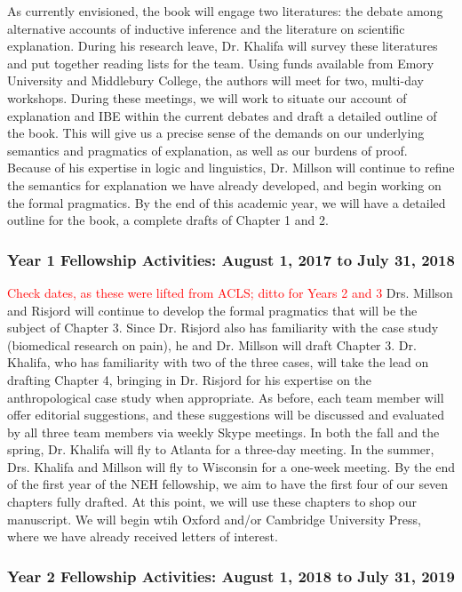 \documentclass{article}[11pt]
\begin{document}
As currently envisioned, the book will engage two literatures:  the debate among alternative accounts of inductive inference and the literature on scientific explanation. During his research leave, Dr. Khalifa will survey these literatures and put together reading lists for the team.  Using funds available from Emory University and Middlebury College, the authors will meet for two, multi-day workshops.  During these meetings, we will work to situate our account of explanation and IBE within the current debates and draft a detailed outline of the book.  This will give us a precise sense of the demands on our underlying semantics and pragmatics of explanation, as well as our burdens of proof. Because of his expertise in logic and linguistics, Dr. Millson will continue to refine the semantics for explanation we have already developed, and begin working on the formal pragmatics. By the end of this academic year, we will have a detailed outline for the book, a complete drafts of Chapter 1 and 2.  

\subsubsection*{Year 1 Fellowship Activities: August 1, 2017 to July 31, 2018}
\textcolor{red}{Check dates, as these were lifted from ACLS; ditto for Years 2 and 3}
Drs. Millson and Risjord will continue to develop the formal pragmatics that will be the subject of Chapter 3. Since Dr. Risjord also has familiarity with the case study (biomedical research on pain), he and Dr. Millson will draft Chapter 3. Dr. Khalifa, who has familiarity with two of the three cases, will take the lead on drafting Chapter 4, bringing in Dr. Risjord for his expertise on the anthropological case study when appropriate. As before, each team member will offer editorial suggestions, and these suggestions will be discussed and evaluated by all three team members via weekly Skype meetings. In both the fall and the spring, Dr. Khalifa will fly to Atlanta for a three-day meeting. In the summer, Drs. Khalifa and Millson will fly to Wisconsin for a one-week meeting. By the end of the first year of the NEH fellowship, we aim to have the first four of our seven chapters fully drafted. At this point, we will use these chapters to shop our manuscript. We will begin wtih Oxford and/or Cambridge University Press, where we have already received letters of interest. 

\subsubsection*{Year 2 Fellowship Activities: August 1, 2018 to July 31, 2019}
\end{document}
